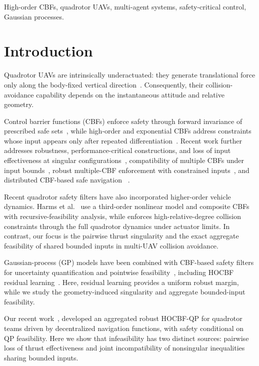 \documentclass[journal,twoside,web]{ieeecolor}
\begin{document}
\begin{IEEEkeywords}
 High-order CBFs, quadrotor UAVs, multi-agent systems, safety-critical control, Gaussian processes.
\end{IEEEkeywords}



\section{Introduction}

Quadrotor UAVs are intrinsically underactuated: they generate
translational force only along the body-fixed vertical
direction~\cite{lee2010geometric}. Consequently, their collision-avoidance
capability depends on the instantaneous attitude and relative
geometry.

Control barrier functions (CBFs) enforce safety through forward
invariance of prescribed safe sets~\cite{AmesTAC2017}, while high-order
and exponential CBFs address constraints whose input appears only after
repeated differentiation~\cite{nguyen2016exponential,xiao2022highorder}.
Recent work further addresses robustness, performance-critical
constructions, and loss of input effectiveness at singular
configurations~\cite{tan2022highorder}, compatibility of multiple CBFs
under input bounds~\cite{tan2022compatibility}, robust multiple-CBF
enforcement with constrained inputs~\cite{cortez2022robustmultiple},
and distributed CBF-based safe navigation~
\cite{mestres2024distributed}.

Recent quadrotor safety filters have also incorporated
higher-order vehicle dynamics. Harms et al.~\cite{harms2025safe}
use a third-order nonlinear model and composite CBFs with
recursive-feasibility analysis, while
\cite{tscholl2026fastbridge} enforces high-relative-degree
collision constraints through the full quadrotor dynamics
under actuator limits. In contrast, our focus is the
pairwise thrust singularity and the exact aggregate
feasibility of shared bounded inputs in multi-UAV collision
avoidance.

Gaussian-process (GP) models have been combined with CBF-based
safety filters for uncertainty quantification and pointwise
feasibility~\cite{castaneda2021pointwise},
including HOCBF residual
learning~\cite{aali2024learning}. Here, residual learning provides a uniform
robust margin, while we study the geometry-induced singularity and
aggregate bounded-input feasibility.

Our recent work~\cite{yagonieto2026safetycritical}, developed an aggregated robust HOCBF-QP for quadrotor teams driven by decentralized navigation
functions, with safety conditional on QP feasibility. Here we show
that infeasibility has two distinct sources: pairwise loss of
thrust effectiveness and joint incompatibility of nonsingular
inequalities sharing bounded inputs.
\end{document}
